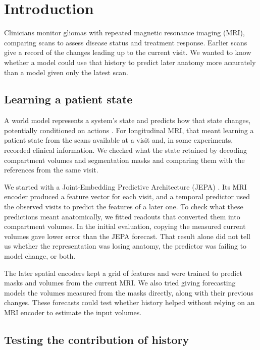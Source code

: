 \clearpage
\chapter{Introduction}

Clinicians monitor gliomas with repeated magnetic resonance imaging (MRI), comparing scans to assess disease status and treatment response. Earlier scans give a record of the changes leading up to the current visit. We wanted to know whether a model could use that history to predict later anatomy more accurately than a model given only the latest scan.

\section{Learning a patient state}

A world model represents a system's state and predicts how that state changes, potentially conditioned on actions \cite{ref2}. For longitudinal MRI, that meant learning a patient state from the scans available at a visit and, in some experiments, recorded clinical information. We checked what the state retained by decoding compartment volumes and segmentation masks and comparing them with the references from the same visit.

We started with a Joint-Embedding Predictive Architecture (JEPA) \cite{ref3}. Its MRI encoder produced a feature vector for each visit, and a temporal predictor used the observed visits to predict the features of a later one. To check what these predictions meant anatomically, we fitted readouts that converted them into compartment volumes. In the initial evaluation, copying the measured current volumes gave lower error than the JEPA forecast. That result alone did not tell us whether the representation was losing anatomy, the predictor was failing to model change, or both.

The later spatial encoders kept a grid of features and were trained to predict masks and volumes from the current MRI. We also tried giving forecasting models the volumes measured from the masks directly, along with their previous changes. These forecasts could test whether history helped without relying on an MRI encoder to estimate the input volumes.

\section{Testing the contribution of history}

